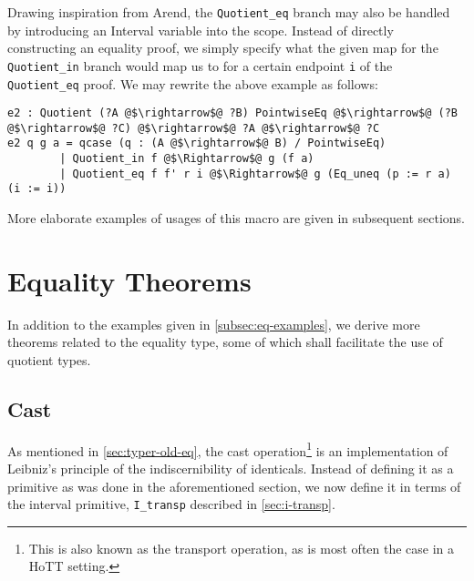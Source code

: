 \documentclass[12pt,twoside,maitrise]{dms}
\theoremstyle{definition}
\numberwithin{equation}{section}
\numberwithin{table}{chapter}
\numberwithin{figure}{chapter}
\newcommand\id[1] {\texttt{#1}}
\begin{document}
Drawing inspiration from Arend, the \id{Quotient\_eq} branch may also be handled
by introducing an Interval variable into the scope. Instead of directly
constructing an equality proof, we simply specify what the given map for the
\id{Quotient\_in} branch would map us to for a certain endpoint \id{i} of the
\id{Quotient\_eq} proof. We may rewrite the above example as follows:


\begin{verbatim}
e2 : Quotient (?A @$\rightarrow$@ ?B) PointwiseEq @$\rightarrow$@ (?B @$\rightarrow$@ ?C) @$\rightarrow$@ ?A @$\rightarrow$@ ?C
e2 q g a = qcase (q : (A @$\rightarrow$@ B) / PointwiseEq)
        | Quotient_in f @$\Rightarrow$@ g (f a)
        | Quotient_eq f f' r i @$\Rightarrow$@ g (Eq_uneq (p := r a) (i := i))
\end{verbatim}

More elaborate examples of usages of this macro are given in subsequent
sections.

\chapter{Equality Theorems}\label{ch:eq-theorems}
In addition to the examples given in \autoref{subsec:eq-examples}, we derive
more theorems related to the equality type, some of which shall facilitate the
use of quotient types.

\section{Cast}\label{sec:eq-transport}
As mentioned in \autoref{sec:typer-old-eq}, the cast operation\footnote{This is
also known as the transport operation, as is most often the case in a HoTT
setting.} is an implementation of Leibniz's principle of the indiscernibility of
identicals. Instead of defining it as a primitive as was done in the
aforementioned section, we now define it in terms of the interval primitive,
\id{I\_transp} described in \autoref{sec:i-transp}.
\end{document}

